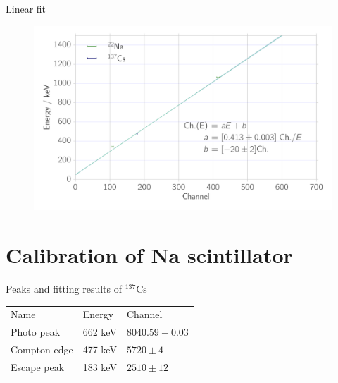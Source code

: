 \documentclass[xcolor=x11names,compress]{beamer}
\renewcommand{\(}{\begin{columns}}
\renewcommand{\)}{\end{columns}}
\newcommand{\<}[1]{\begin{column}{#1}}
\renewcommand{\>}{\end{column}}
\begin{document}
\begin{frame}[t]{Linear fit}
    
\begin{figure}[htpb]
    \centering
    \includegraphics[width=1.0\linewidth]{../analysis/figures/calibration_ps_linear_fit}
\label{fig:calibration_ps_linear_fit}
\end{figure}
\end{frame}

\section{Calibration of Na scintillator}

\begin{frame}[t]{Peaks and fitting results of $^{137}$Cs}

    \begin{table}[htpb]
    \centering
\label{tab:peaks_cs_ps}
    \begin{tabular}{lll}
        \rowcolor{LightCyan} Name &Energy & Channel \\ 
        Photo peak & 662 keV & $8040.59 \pm 0.03$\\ 
        Compton edge & 477 keV & $5720 \pm 4$\\  
        Escape peak & 183 keV & $2510 \pm 12$
    \end{tabular}
\end{table}

\end{frame}
\end{document}
